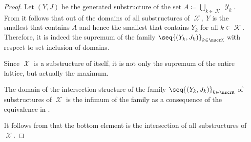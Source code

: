 \begin{proof}
   Let \( (Y, J) \) be the generated substructure of the set \( A \coloneqq \bigcup_{k \in \mscrK} \mscrY_k \). From  it follows that out of the domains of all substructures of \( \mscrX \), \( Y \) is the smallest that contains \( A \) and hence the smallest that contains \( Y_k \) for all \( k \in \mscrK \). Therefore, it is indeed the supremum of the family \( \seq{ (Y_k, J_k) }_{k \in \mscrK} \) with respect to set inclusion of domains.

   Since \( \mscrX \) is a substructure of itself, it is not only the supremum of the entire lattice, but actually the maximum.

   The domain of the intersection structure of the family \( \seq{ (Y_k, J_k) }_{k \in \mscrK} \) of substructures of \( \mscrX \) is the infimum of the family as a consequence of the equivalence in .

   It follows from  that the bottom element is the intersection of all substructures of \( \mscrX \).
\end{proof}


